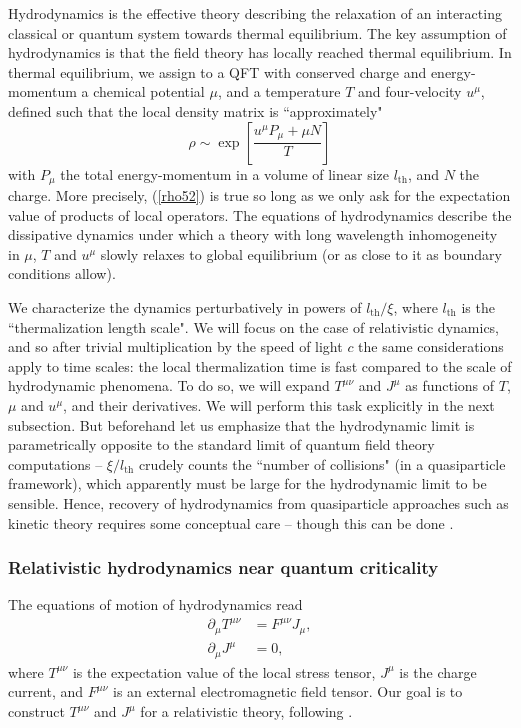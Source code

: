 \documentclass[10pt, oneside]{book}
\begin{document}
\begin{doublespace}
Hydrodynamics is the effective theory describing the relaxation of an interacting classical or quantum system towards thermal equilibrium.   
The key assumption of hydrodynamics is that the field theory has locally reached thermal equilibrium.  In thermal equilibrium, we assign to a QFT with conserved charge and energy-momentum a chemical potential $\mu$, and a temperature $T$ and four-velocity $u^\mu$,  defined such that the local density matrix is ``approximately" \begin{equation}
\rho \sim \exp\left[\frac{u^\mu P_\mu + \mu N}{T}\right]   \label{rho52}
\end{equation}
with $P_\mu$ the total energy-momentum in a volume of linear size $l_{\mathrm{th}}$, and $N$ the charge.   More precisely, (\ref{rho52}) is true so long as we only ask for the expectation value of products of local operators.   The equations of hydrodynamics describe the dissipative dynamics under which a theory with long wavelength inhomogeneity in $\mu$, $T$ and $u^\mu$ slowly relaxes to global equilibrium (or as close to it as boundary conditions allow).

We characterize the dynamics perturbatively in powers of $l_{\mathrm{th}}/\xi$, where $l_{\mathrm{th}}$ is the ``thermalization length scale".   We will focus on the case of relativistic dynamics, and so after trivial multiplication by the speed of light $c$ the same considerations apply to time scales:   the local thermalization time is fast compared to the scale of hydrodynamic phenomena.     To do so, we will expand $T^{\mu\nu}$ and $J^\mu$ as functions of $T$, $\mu$ and $u^\mu$, and their derivatives.   We will perform this task explicitly in the next subsection.   But beforehand let us emphasize that the hydrodynamic limit is parametrically opposite to the standard limit of quantum field theory computations -- $\xi/l_{\mathrm{th}}$ crudely counts the ``number of collisions" (in a quasiparticle framework), which apparently must be large for the hydrodynamic limit to be sensible.   Hence, recovery of hydrodynamics from quasiparticle approaches such as kinetic theory requires some conceptual care -- though this can be done \cite{Arnold:1997gh, Arnold:2000dr}.

\subsubsection{Relativistic hydrodynamics near quantum criticality}
The equations of motion of hydrodynamics read \begin{subequations}\begin{align}
\partial_\mu T^{\mu\nu} &= F^{\mu\nu}J_\mu, \label{eq:dmuTmu}\\
\partial_\mu J^\mu &=  0,  \label{eq:dmujmu}
\end{align}\end{subequations}
where $T^{\mu\nu}$ is the expectation value of the local stress tensor,  $J^\mu$ is the charge current, and $F^{\mu\nu}$ is an external electromagnetic field tensor.   Our goal is to construct $T^{\mu\nu}$ and $J^\mu$ for a relativistic theory, following \cite{hkms}.    


\end{doublespace}
\end{document}
